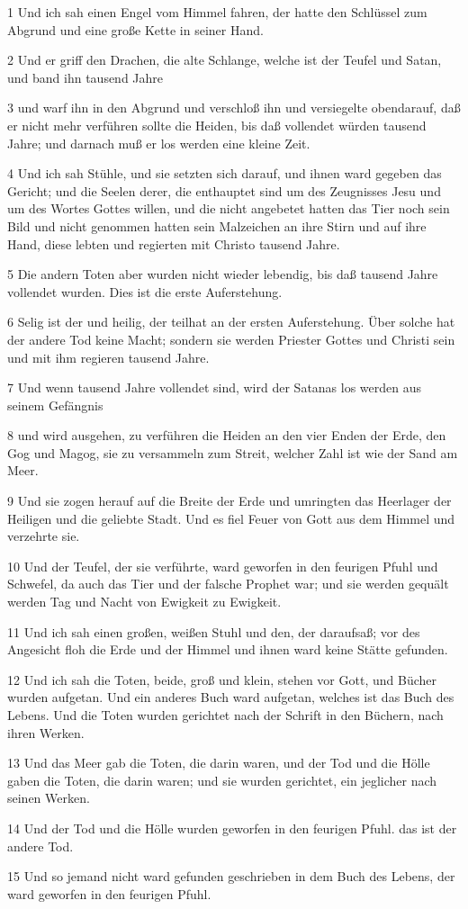 \par 1 Und ich sah einen Engel vom Himmel fahren, der hatte den Schlüssel zum Abgrund und eine große Kette in seiner Hand.
\par 2 Und er griff den Drachen, die alte Schlange, welche ist der Teufel und Satan, und band ihn tausend Jahre
\par 3 und warf ihn in den Abgrund und verschloß ihn und versiegelte obendarauf, daß er nicht mehr verführen sollte die Heiden, bis daß vollendet würden tausend Jahre; und darnach muß er los werden eine kleine Zeit.
\par 4 Und ich sah Stühle, und sie setzten sich darauf, und ihnen ward gegeben das Gericht; und die Seelen derer, die enthauptet sind um des Zeugnisses Jesu und um des Wortes Gottes willen, und die nicht angebetet hatten das Tier noch sein Bild und nicht genommen hatten sein Malzeichen an ihre Stirn und auf ihre Hand, diese lebten und regierten mit Christo tausend Jahre.
\par 5 Die andern Toten aber wurden nicht wieder lebendig, bis daß tausend Jahre vollendet wurden. Dies ist die erste Auferstehung.
\par 6 Selig ist der und heilig, der teilhat an der ersten Auferstehung. Über solche hat der andere Tod keine Macht; sondern sie werden Priester Gottes und Christi sein und mit ihm regieren tausend Jahre.
\par 7 Und wenn tausend Jahre vollendet sind, wird der Satanas los werden aus seinem Gefängnis
\par 8 und wird ausgehen, zu verführen die Heiden an den vier Enden der Erde, den Gog und Magog, sie zu versammeln zum Streit, welcher Zahl ist wie der Sand am Meer.
\par 9 Und sie zogen herauf auf die Breite der Erde und umringten das Heerlager der Heiligen und die geliebte Stadt. Und es fiel Feuer von Gott aus dem Himmel und verzehrte sie.
\par 10 Und der Teufel, der sie verführte, ward geworfen in den feurigen Pfuhl und Schwefel, da auch das Tier und der falsche Prophet war; und sie werden gequält werden Tag und Nacht von Ewigkeit zu Ewigkeit.
\par 11 Und ich sah einen großen, weißen Stuhl und den, der daraufsaß; vor des Angesicht floh die Erde und der Himmel und ihnen ward keine Stätte gefunden.
\par 12 Und ich sah die Toten, beide, groß und klein, stehen vor Gott, und Bücher wurden aufgetan. Und ein anderes Buch ward aufgetan, welches ist das Buch des Lebens. Und die Toten wurden gerichtet nach der Schrift in den Büchern, nach ihren Werken.
\par 13 Und das Meer gab die Toten, die darin waren, und der Tod und die Hölle gaben die Toten, die darin waren; und sie wurden gerichtet, ein jeglicher nach seinen Werken.
\par 14 Und der Tod und die Hölle wurden geworfen in den feurigen Pfuhl. das ist der andere Tod.
\par 15 Und so jemand nicht ward gefunden geschrieben in dem Buch des Lebens, der ward geworfen in den feurigen Pfuhl.


